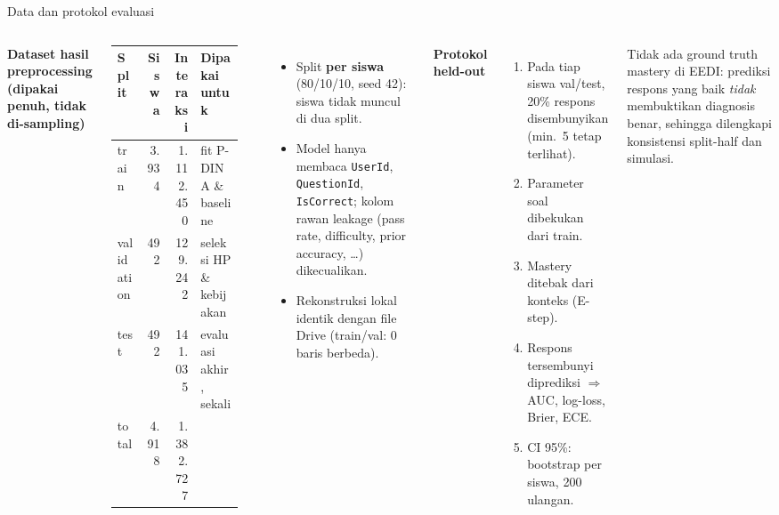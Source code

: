 \documentclass[aspectratio=169,10pt]{beamer}
\begin{document}
\begin{frame}{Data dan protokol evaluasi}
  \begin{columns}[T]
    \footnotesize
    \textbf{Dataset hasil preprocessing (dipakai penuh, tidak di-sampling)}\\[3pt]
    \begin{tabular}{@{}lrrl@{}}
      \toprule
      Split & Siswa & Interaksi & Dipakai untuk \\
      \midrule
      train & 3.934 & 1.112.450 & fit P-DINA \& baseline \\
      validation & 492 & 129.242 & seleksi HP \& kebijakan \\
      test & 492 & 141.035 & evaluasi akhir, sekali \\
      \midrule
      total & 4.918 & 1.382.727 & \\
      \bottomrule
    \end{tabular}\\[4pt]
    \begin{itemize}
      \item Split \textbf{per siswa} (80/10/10, seed 42): siswa tidak muncul di dua split.
      \item Model hanya membaca \texttt{UserId}, \texttt{QuestionId}, \texttt{IsCorrect}; kolom rawan leakage
            (pass rate, difficulty, prior accuracy, \dots) dikecualikan.
      \item Rekonstruksi lokal identik dengan file Drive (train/val: 0 baris berbeda).
    \end{itemize}
    \footnotesize
    \textbf{Protokol held-out}
    \begin{enumerate}
      \item Pada tiap siswa val/test, 20\% respons disembunyikan (min.\ 5 tetap terlihat).
      \item Parameter soal dibekukan dari train.
      \item Mastery ditebak dari konteks (E-step).
      \item Respons tersembunyi diprediksi $\Rightarrow$ AUC, log-loss, Brier, ECE.
      \item CI 95\%: bootstrap per siswa, 200 ulangan.
    \end{enumerate}
    \begin{warnbox}
      Tidak ada ground truth mastery di EEDI: prediksi respons yang baik \emph{tidak} membuktikan diagnosis benar,
      sehingga dilengkapi konsistensi split-half dan simulasi.
    \end{warnbox}
  \end{columns}
\end{frame}
\end{document}
